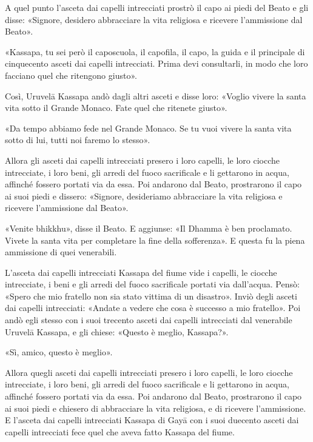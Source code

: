 A quel punto l’asceta dai capelli intrecciati prostrò il capo ai piedi
del Beato e gli disse: «Signore, desidero abbracciare la vita religiosa
e ricevere l’ammissione dal Beato».


«Kassapa, tu sei però il caposcuola, il capofila, il capo, la guida e il
principale di cinquecento asceti dai capelli intrecciati. Prima devi
consultarli, in modo che loro facciano quel che ritengono giusto».


Così, Uruvelā Kassapa andò dagli altri asceti e disse loro: «Voglio
vivere la santa vita sotto il Grande Monaco. Fate quel che ritenete
giusto».


«Da tempo abbiamo fede nel Grande Monaco. Se tu vuoi vivere la santa
vita sotto di lui, tutti noi faremo lo stesso».


Allora gli asceti dai capelli intrecciati presero i loro capelli, le
loro ciocche intrecciate, i loro beni, gli arredi del fuoco sacrificale
e li gettarono in acqua, affinché fossero portati via da essa. Poi
andarono dal Beato, prostrarono il capo ai suoi piedi e dissero:
«Signore, desideriamo abbracciare la vita religiosa e ricevere
l’ammissione dal Beato».


«Venite bhikkhu», disse il Beato. E aggiunse: «Il Dhamma è ben
proclamato. Vivete la santa vita per completare la fine della
sofferenza». E questa fu la piena ammissione di quei venerabili.


L’asceta dai capelli intrecciati Kassapa del fiume vide i capelli, le
ciocche intrecciate, i beni e gli arredi del fuoco sacrificale portati
via dall’acqua. Pensò: «Spero che mio fratello non sia stato vittima di
un disastro». Inviò degli asceti dai capelli intrecciati: «Andate a
vedere che cosa è successo a mio fratello». Poi andò egli stesso con i
suoi trecento asceti dai capelli intrecciati dal venerabile Uruvelā
Kassapa, e gli chiese: «Questo è meglio, Kassapa?».


«Sì, amico, questo è meglio».


Allora quegli asceti dai capelli intrecciati presero i loro capelli, le
loro ciocche intrecciate, i loro beni, gli arredi del fuoco sacrificale
e li gettarono in acqua, affinché fossero portati via da essa. Poi
andarono dal Beato, prostrarono il capo ai suoi piedi e chiesero di
abbracciare la vita religiosa, e di ricevere l’ammissione. E l’asceta
dai capelli intrecciati Kassapa di Gayā con i suoi duecento asceti dai
capelli intrecciati fece quel che aveva fatto Kassapa del fiume.




